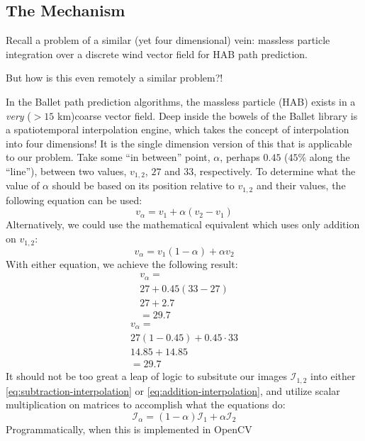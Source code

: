 \documentclass[a4paper]{article}
\begin{document}
\subsection{The Mechanism} Recall a problem of a similar (yet four dimensional) vein: massless particle integration over a discrete wind vector field for HAB path prediction.\\
\par\noindent But how is this even remotely a similar problem?!\\
\par\noindent In the Ballet path prediction algorithms, the massless particle (HAB) exists in a \textit{very} ($>15$ km)coarse vector field. Deep inside the bowels of the Ballet library is a spatiotemporal interpolation engine, which takes the concept of interpolation into four dimensions! It is the single dimension version of this that is applicable to our problem. Take some ``in between'' point, $\alpha$, perhaps $0.45$ ($45$\% along the ``line''), between two values, $v_{1,2}$, $27$ and $33$, respectively. To determine what the value of $\alpha$ should be based on its position relative to $v_{1,2}$ and their values, the following equation can be used:
\begin{equation}\label{eq:subtraction-interpolation}
  v_{\alpha} = v_{1} + \alpha\left(v_{2} - v_{1}\right)
\end{equation}
Alternatively, we could use the mathematical equivalent which uses only addition on $v_{1,2}$:
\begin{equation}\label{eq:addition-interpolation}
  v_{\alpha} = v_{1}(1-\alpha)+\alpha v_{2}
\end{equation}
With either equation, we achieve the following result:
\begin{multline}
  v_{\alpha}=\\
  27 + 0.45\left(33-27\right)\\
  27+2.7\\
  =29.7
\end{multline}
\begin{multline}
  v_{\alpha}=\\
  27\left(1-0.45\right)+0.45\cdot 33\\
  14.85+14.85\\
  =29.7
\end{multline}
It should not be too great a leap of logic to subsitute our images $\mathcal{I}_{1,2}$ into either \ref{eq:subtraction-interpolation} or \ref{eq:addition-interpolation}, and utilize scalar multiplication on matrices to accomplish what the equations do:
\begin{equation}
  \mathcal{I}_{\alpha}=\left(1-\alpha\right)\mathcal{I}_{1}+\alpha\mathcal{I}_{2}
\end{equation}
Programmatically, when this is implemented in OpenCV~\cite{opencv_library}
\end{document}
